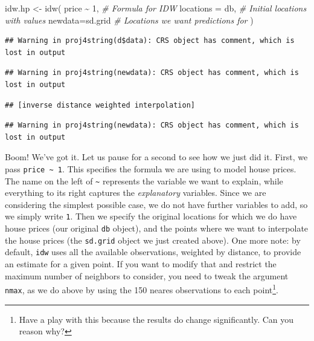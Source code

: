 \documentclass[
]{book}
\newenvironment{Shaded}{\begin{snugshade}}{\end{snugshade}}
\newcommand{\AttributeTok}[1]{\textcolor[rgb]{0.77,0.63,0.00}{#1}}
\newcommand{\CommentTok}[1]{\textcolor[rgb]{0.56,0.35,0.01}{\textit{#1}}}
\newcommand{\DecValTok}[1]{\textcolor[rgb]{0.00,0.00,0.81}{#1}}
\newcommand{\FunctionTok}[1]{\textcolor[rgb]{0.00,0.00,0.00}{#1}}
\newcommand{\NormalTok}[1]{#1}
\newcommand{\OtherTok}[1]{\textcolor[rgb]{0.56,0.35,0.01}{#1}}
\newcommand{\SpecialCharTok}[1]{\textcolor[rgb]{0.00,0.00,0.00}{#1}}
\begin{document}
\begin{Shaded}
\begin{Highlighting}[]
\NormalTok{idw.hp }\OtherTok{\textless{}{-}} \FunctionTok{idw}\NormalTok{(}
\NormalTok{  price }\SpecialCharTok{\textasciitilde{}} \DecValTok{1}\NormalTok{,         }\CommentTok{\# Formula for IDW}
  \AttributeTok{locations =}\NormalTok{ db,    }\CommentTok{\# Initial locations with values}
  \AttributeTok{newdata=}\NormalTok{sd.grid    }\CommentTok{\# Locations we want predictions for}
\NormalTok{)}
\end{Highlighting}
\end{Shaded}

\begin{verbatim}
## Warning in proj4string(d$data): CRS object has comment, which is lost in output
\end{verbatim}

\begin{verbatim}
## Warning in proj4string(newdata): CRS object has comment, which is lost in output
\end{verbatim}

\begin{verbatim}
## [inverse distance weighted interpolation]
\end{verbatim}

\begin{verbatim}
## Warning in proj4string(newdata): CRS object has comment, which is lost in output
\end{verbatim}

Boom! We've got it. Let us pause for a second to see how we just did it. First, we pass \texttt{price\ \textasciitilde{}\ 1}. This specifies the formula we are using to model house prices. The name on the left of \texttt{\textasciitilde{}} represents the variable we want to explain, while everything to its right captures the \emph{explanatory} variables. Since we are considering the simplest possible case, we do not have further variables to add, so we simply write \texttt{1}. Then we specify the original locations for which we do have house prices (our original \texttt{db} object), and the points where we want to interpolate the house prices (the \texttt{sd.grid} object we just created above). One more note: by default, \texttt{idw} uses all the available observations, weighted by distance, to provide an estimate for a given point. If you want to modify that and restrict the maximum number of neighbors to consider, you need to tweak the argument \texttt{nmax}, as we do above by using the 150 neares observations to each point\footnote{Have a play with this because the results do change significantly. Can you reason why?}.
\end{document}
